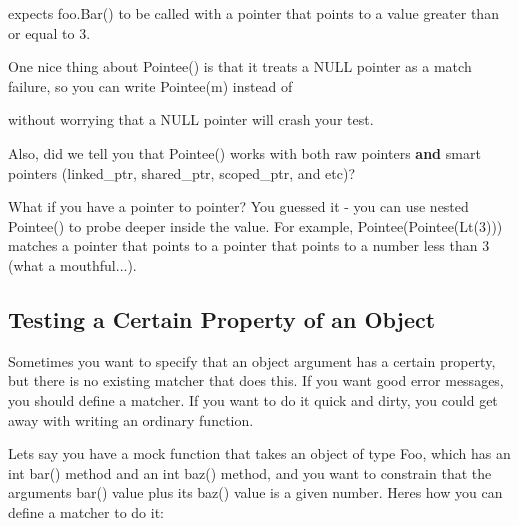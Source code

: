 expects {\ttfamily foo.\+Bar()} to be called with a pointer that points to a value greater than or equal to 3.

One nice thing about {\ttfamily Pointee()} is that it treats a {\ttfamily N\+U\+LL} pointer as a match failure, so you can write {\ttfamily Pointee(m)} instead of


\begin{DoxyCode}{0}
\end{DoxyCode}


without worrying that a {\ttfamily N\+U\+LL} pointer will crash your test.

Also, did we tell you that {\ttfamily Pointee()} works with both raw pointers {\bfseries{and}} smart pointers ({\ttfamily linked\+\_\+ptr}, {\ttfamily shared\+\_\+ptr}, {\ttfamily scoped\+\_\+ptr}, and etc)?

What if you have a pointer to pointer? You guessed it -\/ you can use nested {\ttfamily Pointee()} to probe deeper inside the value. For example, {\ttfamily Pointee(Pointee(\+Lt(3)))} matches a pointer that points to a pointer that points to a number less than 3 (what a mouthful...).

\subsection*{Testing a Certain Property of an Object}

Sometimes you want to specify that an object argument has a certain property, but there is no existing matcher that does this. If you want good error messages, you should define a matcher. If you want to do it quick and dirty, you could get away with writing an ordinary function.

Let\textquotesingle{}s say you have a mock function that takes an object of type {\ttfamily Foo}, which has an {\ttfamily int bar()} method and an {\ttfamily int baz()} method, and you want to constrain that the argument\textquotesingle{}s {\ttfamily bar()} value plus its {\ttfamily baz()} value is a given number. Here\textquotesingle{}s how you can define a matcher to do it\+:



